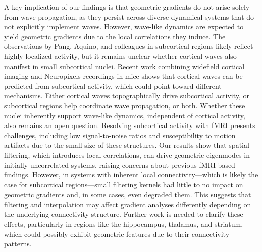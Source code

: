 \documentclass{article}
\begin{document}
A key implication of our findings is that geometric gradients do not arise solely from wave propagation, as they persist across diverse dynamical systems that do not explicitly implement waves. However, wave-like dynamics are expected to yield geometric gradients due to the local correlations they induce. The observations by Pang, Aquino, and colleagues in subcortical regions likely reflect highly localized activity, but it remains unclear whether cortical waves also manifest in small subcortical nuclei. Recent work combining widefield cortical imaging and Neuropixels recordings in mice shows that cortical waves can be predicted from subcortical activity, which could point toward different mechanisms. Either cortical waves topographically drive subcortical activity, or subcortical regions help coordinate wave propagation, or both. Whether these nuclei inherently support wave-like dynamics, independent of cortical activity, also remains an open question. Resolving subcortical activity with fMRI presents challenges, including low signal-to-noise ratios and susceptibility to motion artifacts due to the small size of these structures. Our results show that spatial filtering, which introduces local correlations, can drive geometric eigenmodes in initially uncorrelated systems, raising concerns about previous fMRI-based findings. However, in systems with inherent local connectivity---which is likely the case for subcortical regions---small filtering kernels had little to no impact on geometric gradients and, in some cases, even degraded them. This suggests that filtering and interpolation may affect gradient analyses differently depending on the underlying connectivity structure. Further work is needed to clarify these effects, particularly in regions like the hippocampus, thalamus, and striatum, which could possibly exhibit geometric features due to their connectivity patterns.
\end{document}
